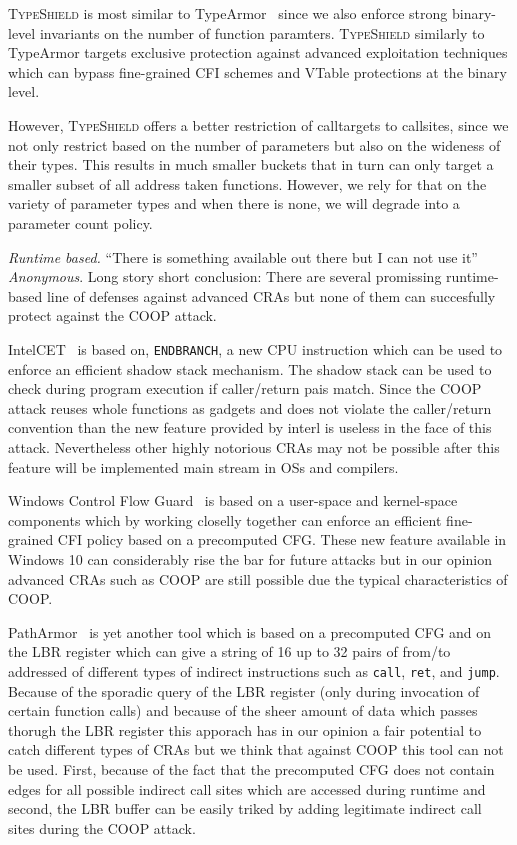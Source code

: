 \textsc{TypeShield} is most similar to TypeArmor~\cite{veen:typearmor} since
we also enforce strong binary-level invariants on the number of function
paramters. \textsc{TypeShield} similarly to TypeArmor targets 
exclusive protection against advanced exploitation techniques 
which can bypass fine-grained CFI schemes and VTable protections at the binary level.

However, \textsc{TypeShield} offers a better restriction of calltargets to callsites, since 
we not only restrict based on the number of parameters but also on the wideness of their types. 
This results in much smaller buckets that in turn can only target a smaller subset of all address
taken functions. However, we rely for that on the variety of parameter types and when there is 
none, we will degrade into a parameter count policy.


\textit{Runtime based.}
``There is something available out there but I can not use it'' \textit{Anonymous}.
Long story short conclusion: There are several promissing runtime-based line of defenses against
advanced CRAs but none of them can succesfully protect against the COOP attack.

IntelCET~\cite{intel:cet} is based on, \texttt{ENDBRANCH}, a new CPU instruction which can be used to enforce
an efficient shadow stack mechanism. The shadow stack can be used to check during program execution if caller/return pais match.
Since the COOP attack reuses whole functions as gadgets and does not violate the caller/return convention than the 
new feature provided by interl is useless in the face of this attack. Nevertheless other highly notorious CRAs may not be possible
after this feature will be implemented main stream in OSs and compilers.

Windows Control Flow Guard~\cite{windows:cfguard} is based on a user-space and kernel-space components which
by working closelly together can enforce an efficient fine-grained CFI policy based on a precomputed CFG.
These new feature available in Windows 10 can considerably rise the bar for future attacks but in our opinion advanced CRAs
such as COOP are still possible due the typical characteristics of COOP.

PathArmor~\cite{veen:cfi} is yet another tool which is based on a precomputed CFG and on the LBR register which can give a string of 16 up to
32 pairs of from/to addressed of different types of indirect instructions such as \texttt{call}, \texttt{ret}, and \texttt{jump}. 
Because of the sporadic query of the LBR register (only during invocation of certain function calls) and because of the sheer amount of 
data which passes thorugh the LBR register this apporach has in our opinion a fair potential to catch different types of CRAs but
we think that against COOP this tool can not be used. First, because of the fact that the precomputed CFG does not contain edges for all
possible indirect call sites which are accessed during runtime and second, the LBR buffer can be easily triked by adding
legitimate indirect call sites  during the COOP attack.


